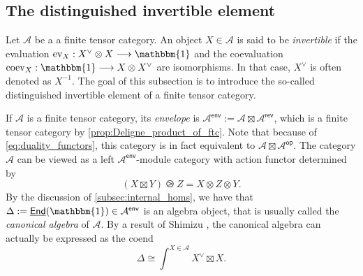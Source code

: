 \documentclass[11pt]{article}
\theoremstyle{definition}
\begin{document}
\subsection{The distinguished invertible element}

Let $\mathcal{A}$ be a a finite tensor category. An object $X \in \mathcal{A}$ is said to be \emph{invertible} if the evaluation $\mathrm{ev}_X: X^\vee \otimes X \longrightarrow \mathbbm{1} $ and the coevaluation $\mathrm{coev}_X: \mathbbm{1} \longrightarrow X \otimes X^\vee$ are isomorphisms. In that case, $X^\vee$ is often denoted as $X^{-1}$. The goal of this subsection is to introduce the so-called distinguished invertible element of a finite tensor category.


If $\mathcal{A}$ is a finite tensor category, its \emph{envelope} is $\mathcal{A}^\mathsf{env} := \mathcal{A} \boxtimes \mathcal{A}^\mathsf{rev}$, which is a finite tensor category by  \cref{prop:Deligne_product_of_ftc}. Note that because of \eqref{eq:duality_functors}, this category is in fact equivalent to $\mathcal{A} \boxtimes \mathcal{A}^\mathsf{op}$. The category $\mathcal{A}$ can be viewed as a left $\mathcal{A}^\mathsf{env}$-module category with action functor determined by 
$$ (X \boxtimes Y) \ogreaterthan Z = X \otimes Z \otimes Y.  $$
By the discussion of \cref{subsec:internal_homs}, we have that $\Delta :=\underline{\mathsf{End}}(\mathbbm{1}) \in \mathcal{A}^\mathsf{env}$ is an algebra object, that is usually called the \emph{canonical algebra} of $\mathcal{A}$. By a result of Shimizu \cite[Lemma 4.4]{shimizuunimodular}, the canonical algebra can actually be expressed as the coend
\begin{equation}\label{eq:Delta_coend}
\Delta \cong \int^{X \in \mathcal{A}} X^\vee  \boxtimes X.   
\end{equation}
\end{document}
